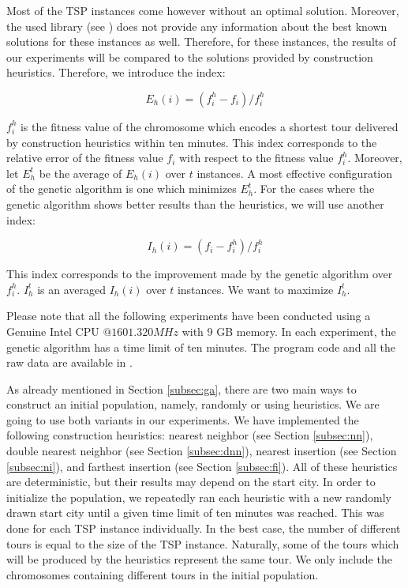  Most of the TSP instances come however without an optimal solution. Moreover, the used library (see \cite{TSPLIB}) does not provide any information about the best known solutions for these instances as well. Therefore, for these instances, the results of our experiments will be compared to the solutions provided by construction heuristics. Therefore, we introduce the index: 
 
 $$E_{h}(i) = (f_{i}^{h} - f_{i}) /f_{i}^{h}$$ 
 
 $f_{i}^{h}$ is the fitness value of the chromosome which encodes a shortest tour delivered by construction heuristics within ten minutes. This index corresponds to the relative error of the fitness value $f_{i}$ with respect to the fitness value $f_{i}^{h}$. Moreover, let $E_{h}^{t}$ be the average of $E_{h}(i)$ over $t$ instances. A most effective configuration of the genetic algorithm is one which minimizes $E_{h}^{t}$. For the cases where the genetic algorithm shows better results than the heuristics, we will use another index: 
 
 $$I_{h}(i)  = (f_{i} - f_{i}^{h})/f_{i}^{h}$$
 
This index corresponds to the improvement made by the genetic algorithm over $f_{i}^{h}$. $I_{h}^{t}$ is an averaged $I_{h}(i)$ over $t$ instances. We want to maximize $I_{h}^{t}$.\par 

Please note that all the following experiments have been conducted using a Genuine Intel CPU $@1601.320 MHz$ with 9 GB memory. In each experiment, the genetic algorithm has a time limit of ten minutes. The program code and all the raw data are available in \cite{Bechberger2020}.\par 

As already mentioned in Section \ref{subsec:ga}, there are two main ways to construct an initial population, namely, randomly or using heuristics. We are going to use both variants in our experiments. We have implemented the following construction heuristics: nearest neighbor (see Section \ref{subsec:nn}), double nearest neighbor  (see Section \ref{subsec:dnn}), nearest insertion (see Section \ref{subsec:ni}), and farthest insertion (see Section \ref{subsec:fi}). All of these heuristics are deterministic, but their results may depend on the start city. In order to initialize the population, we repeatedly ran each heuristic with a new randomly drawn start city until a given time limit of ten minutes was reached. This was done for each TSP instance individually. In the best case, the number of different tours is equal to the size of the TSP instance. Naturally, some of the tours which will be produced by the heuristics represent the same tour. We only include the chromosomes containing different tours in the initial population.\par

